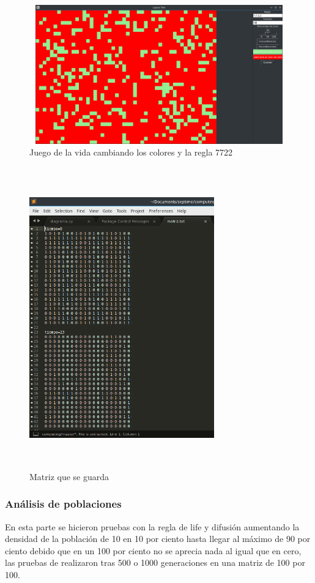 \begin{figure}[H]
\begin{center}
 \includegraphics[width=13cm, height=6cm]{./img/gol_colores.png}
 \caption{Juego de la vida cambiando los colores y la regla 7722}
 \label{fig:gol_colores}
\end{center}
\end{figure}

\begin{figure}[H]
\begin{center}
 \includegraphics[width=8cm, height=13cm]{./img/matriz.png}
 \caption{Matriz que se guarda}
 \label{fig:matriz}
\end{center}
\end{figure}

\subsubsection{Análisis de poblaciones}
En esta parte se hicieron pruebas con la regla de life y difusión aumentando la densidad de la población de 10 en 10 por ciento hasta llegar al máximo de 90 por ciento debido que en un 100 por ciento no se aprecia nada al igual que en cero, las pruebas de realizaron tras 500 o 1000 generaciones en una matriz de 100 por 100.

